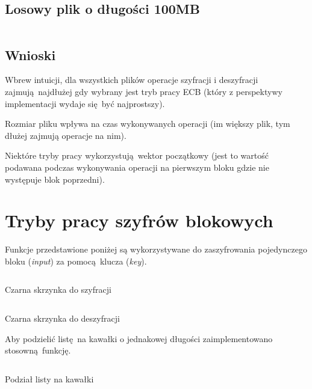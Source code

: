 \documentclass[12pt]{article}
\newenvironment*{dummyenv}{}{}
\begin{document}
\subsection{Losowy plik o długości 100MB}

\begin{dummyenv}
	\inputminted[firstline=182,lastline=271]{yaml}{2-enc-dec-time.txt}
\end{dummyenv}

\subsection{Wnioski}

Wbrew intuicji, dla wszystkich plików operacje szyfracji i deszyfracji
zajmują najdłużej gdy wybrany jest tryb pracy ECB (który z perspektywy implementacji
wydaje się być najprostszy).

Rozmiar pliku wpływa na czas wykonywanych operacji (im większy plik, tym dłużej
zajmują operacje na nim).

Niektóre tryby pracy wykorzystują wektor początkowy (jest to wartość podawana
podczas wykonywania operacji na pierwszym bloku gdzie nie występuje blok poprzedni).

\newpage

\section{Tryby pracy szyfrów blokowych}

Funkcje przedstawione poniżej są wykorzystywane do zaszyfrowania pojedynczego
bloku (\textit{input}) za pomocą klucza (\textit{key}).

\begin{listing}[H]
	\inputminted[firstline=9,lastline=13]{python}{../aes.py}
	\caption{Czarna skrzynka do szyfracji}
\end{listing}

\begin{listing}[H]
	\inputminted[firstline=15,lastline=19]{python}{../aes.py}
	\caption{Czarna skrzynka do deszyfracji}
\end{listing}

Aby podzielić listę na kawałki o jednakowej długości 
zaimplementowano stosowną funkcję.

\begin{listing}[H]
	\inputminted[firstline=21,lastline=24]{python}{../aes.py}
	\caption{Podział listy na kawałki}
\end{listing}
\end{document}
